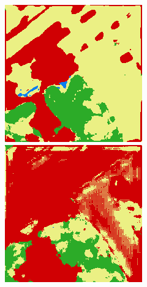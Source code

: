 \begin{figure}
    \includegraphics[width=\DensenetPredictionsImageWidth]{images/densenet/densenet-67D/291991-prediction} \hfill
    \includegraphics[width=\DensenetPredictionsImageWidth]{images/densenet/densenet-56D/291991-prediction}


\end{figure}
